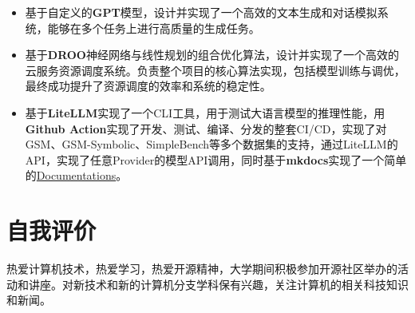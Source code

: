 \documentclass{resume}
\begin{document}
\begin{itemize}[parsep=0.5ex]
  \item 基于自定义的\textbf{GPT}模型，设计并实现了一个高效的文本生成和对话模拟系统，能够在多个任务上进行高质量的生成任务。
\end{itemize}


\begin{itemize}[parsep=0.5ex]
  \item 基于\textbf{DROO}神经网络与线性规划的组合优化算法，设计并实现了一个高效的云服务资源调度系统。负责整个项目的核心算法实现，包括模型训练与调优，最终成功提升了资源调度的效率和系统的稳定性。 
\end{itemize}

\begin{itemize}[parsep=0.5ex]
  \item 基于\textbf{LiteLLM}实现了一个CLI工具，用于测试大语言模型的推理性能，用\textbf{Github Action}实现了开发、测试、编译、分发的整套CI/CD，实现了对GSM、GSM-Symbolic、SimpleBench等多个数据集的支持，通过LiteLLM的API，实现了任意Provider的模型API调用，同时基于\textbf{mkdocs}实现了一个简单的\href{http://ashengstd.github.io/llm_evaluation_in_reasoning/}{Documentations}。
\end{itemize}

\section{自我评价}
\quad\quad 热爱计算机技术，热爱学习，热爱开源精神，大学期间积极参加开源社区举办的活动和讲座。对新技术和新的计算机分支学科保有兴趣，关注计算机的相关科技知识和新闻。
\end{document}
